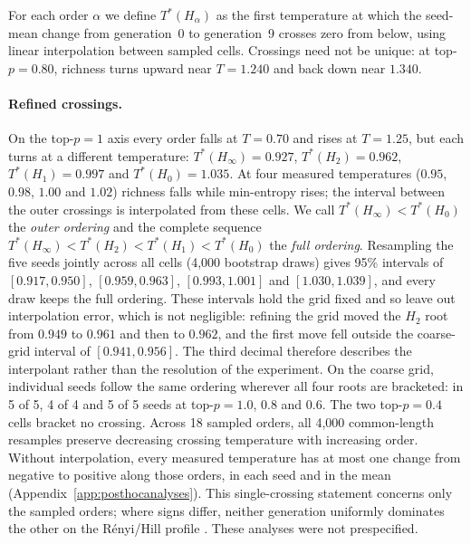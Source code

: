 \documentclass[10pt]{article}
\theoremstyle{plain}
\theoremstyle{definition}
\newcommand{\Htwo}{H_2}
\newcommand{\Hz}{H_0}
\newcommand{\Hinf}{H_\infty}
\begin{document}
For each order $\alpha$ we define $T^\ast(H_\alpha)$ as the first temperature at which the
seed-mean change from generation~0 to generation~9 crosses zero from below, using linear
interpolation between sampled cells. Crossings need not be unique: at top-$p=0.80$, richness
turns upward near $T=1.240$ and back down near $1.340$.

\paragraph{Refined crossings.} On the top-$p=1$ axis every order falls at $T=0.70$ and rises at
$T=1.25$, but each turns at a different temperature: $T^\ast(\Hinf)=0.927$,
$T^\ast(\Htwo)=0.962$, $T^\ast(H_1)=0.997$ and $T^\ast(\Hz)=1.035$. At four measured
temperatures ($0.95$, $0.98$, $1.00$ and $1.02$) richness falls while min-entropy rises; the
interval between the outer crossings is interpolated from these cells. We call
$T^\ast(\Hinf)<T^\ast(\Hz)$ the \emph{outer ordering} and the complete sequence
$T^\ast(\Hinf)<T^\ast(\Htwo)<T^\ast(H_1)<T^\ast(\Hz)$ the \emph{full ordering}. Resampling the
five seeds jointly across all cells (4,000 bootstrap draws) gives 95\% intervals of
$[0.917,0.950]$, $[0.959,0.963]$, $[0.993,1.001]$ and $[1.030,1.039]$, and every draw keeps the
full ordering. These intervals hold the grid fixed and so leave out interpolation error, which
is not negligible: refining the grid moved the $\Htwo$ root from $0.949$ to $0.961$ and then to
$0.962$, and the first move fell outside the coarse-grid interval of $[0.941,0.956]$. The third
decimal therefore describes the interpolant rather than the resolution of the experiment. On the coarse
grid, individual seeds follow the same ordering wherever all four roots are bracketed: in 5 of
5, 4 of 4 and 5 of 5 seeds at top-$p=1.0$, $0.8$ and $0.6$. The two top-$p=0.4$ cells bracket
no crossing. Across 18 sampled orders, all 4,000 common-length resamples preserve decreasing
crossing temperature with increasing order. Without interpolation, every measured temperature
has at most one change from negative to positive along those orders, in each seed and in the
mean (Appendix~\ref{app:posthocanalyses}). This single-crossing statement concerns only the
sampled orders; where signs differ, neither generation uniformly dominates the other on the
R\'enyi/Hill profile \citep{patil1982diversity,tothmeresz1995}. These analyses were not prespecified.
\end{document}
